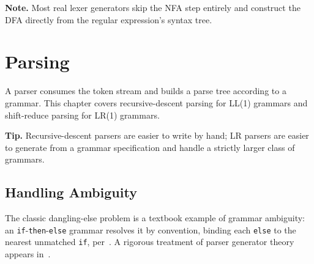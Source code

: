 \documentclass[nocfonts]{nostarch}
\begin{document}
\textbf{Note.} Most real lexer generators skip the NFA step entirely
and construct the DFA directly from the regular expression's syntax
tree.

\chapter{Parsing}
\label{ch:parser}

A parser consumes the token stream and builds a parse
tree according to a grammar. This chapter covers recursive-descent
parsing for LL(1) grammars and shift-reduce parsing for LR(1)
grammars.

\textbf{Tip.} Recursive-descent parsers are easier to write by hand; LR
parsers are easier to generate from a grammar specification and handle
a strictly larger class of grammars.

\section{Handling Ambiguity}

The classic dangling-else problem is a textbook
example of grammar ambiguity: an \texttt{if}-\texttt{then}-\texttt{else}
grammar resolves it by convention, binding each \texttt{else} to the
nearest unmatched \texttt{if}, per~\citet{aho2006compilers}. A rigorous
treatment of parser generator theory appears
in~\citet{grune2008parsing}.

\backmatter




\printindex
\end{document}
